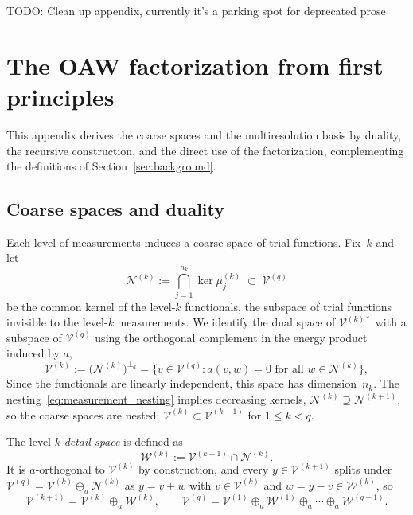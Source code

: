\appendix

TODO: Clean up appendix, currently it's a parking spot for deprecated prose
\section{The OAW factorization from first principles}
\label{app:oaw}

This appendix derives the coarse spaces and the multiresolution basis by
duality, the recursive construction, and the direct use of the
factorization, complementing the definitions of
Section~\ref{sec:background}.

\subsection{Coarse spaces and duality}
\label{app:oaw:duality}

Each level of measurements induces a coarse space of trial functions.
Fix~$k$ and let
\[
  \mathcal{N}^{(k)} := \bigcap_{j=1}^{n_k} \ker \mu^{(k)}_j
  \;\subset\; \mathcal{V}^{(q)}
\]
be the common kernel of the level-$k$ functionals, the subspace of trial
functions invisible to the level-$k$ measurements.  We identify the dual space of
$\mathcal{V}^{(k)*}$ with a subspace of
$\mathcal{V}^{(q)}$  using the orthogonal complement in the energy product induced by $a$,
\[
  \mathcal{V}^{(k)} := \bigl(\mathcal{N}^{(k)}\bigr)^{\perp_a}
  = \bigl\{ v \in \mathcal{V}^{(q)} : a(v,w) = 0
    \text{ for all } w \in \mathcal{N}^{(k)} \bigr\},
\]
Since the functionals are linearly independent, this space has dimension~$n_k$. The
nesting~\eqref{eq:measurement_nesting} implies decreasing kernels, $\mathcal{N}^{(k)} \supseteq \mathcal{N}^{(k+1)}$, so the
coarse spaces are nested: $\mathcal{V}^{(k)} \subset \mathcal{V}^{(k+1)}$
for $1 \leq k < q$.

The level-$k$ \emph{detail space} is defined as
\[
  \mathcal{W}^{(k)} := \mathcal{V}^{(k+1)} \cap \mathcal{N}^{(k)} .
\]
It is $a$-orthogonal to $\mathcal{V}^{(k)}$ by construction, and every
$y \in \mathcal{V}^{(k+1)}$ splits under $\mathcal{V}^{(q)} =
\mathcal{V}^{(k)} \oplus_a \mathcal{N}^{(k)}$ as $y = v + w$ with $v \in
\mathcal{V}^{(k)}$ and $w = y - v \in \mathcal{W}^{(k)}$, so
\begin{equation}
  \mathcal{V}^{(k+1)} = \mathcal{V}^{(k)} \oplus_a \mathcal{W}^{(k)},
  \qquad
  \mathcal{V}^{(q)} = \mathcal{V}^{(1)} \oplus_a \mathcal{W}^{(1)}
  \oplus_a \cdots \oplus_a \mathcal{W}^{(q-1)} .
\end{equation}

